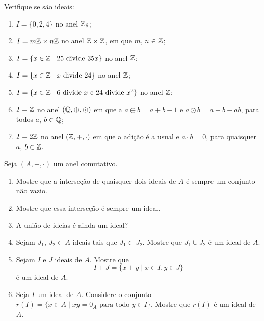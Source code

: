 \documentclass[12pt]{exam}
\begin{document}
    \questao{} Verifique se são ideais:
    \begin{enumerate}[label=({\alph*})]
        \item  $I = \{\overline{0}, \overline{2}, \overline{4}\}$ no anel $\mathbb{Z}_6$;

        \item $I = m\mathbb{Z} \times n\mathbb{Z}$ no anel $\mathbb{Z} \times \mathbb{Z}$, em que $m$, $n \in \mathbb{Z}$;

        \item $I = \{x \in \mathbb{Z} \mid 25 \mbox{ divide } 35x\}$ no anel $\mathbb{Z}$;

        \item $I = \{x \in \mathbb{Z} \mid x \mbox{ divide } 24\}$ no anel $\mathbb{Z}$;

        \item $I = \{x \in \mathbb{Z} \mid 6 \mbox{ divide } x \mbox{ e } 24 \mbox{ divide } x^2\}$ no anel $\mathbb{Z}$;

        \item $I = \mathbb{Z}$ no anel $(\mathbb{Q}, \oplus, \odot)$ em que a $a \oplus b = a + b - 1$ e $a \odot b = a + b - ab$, para todos $a$, $b \in \mathbb{Q}$;

        \item $I = 2\mathbb{Z}$ no anel $(\mathbb{Z}, +, \cdot)$ em que a adição é a usual e $a \cdot b = 0$, para quaisquer $a$, $b \in \mathbb{Z}$.
    \end{enumerate}

    \vspace{.3cm}

    \questao{} Seja $(A, +, \cdot)$ um anel comutativo.
    \begin{enumerate}[label=({\alph*})]
        \item Mostre que a interseção de quaisquer dois ideais de $A$ é sempre um conjunto não vazio.

        \item Mostre que essa interseção é sempre um ideal.

        \item A união de ideias é ainda um ideal?

        \item Sejam $J_1$, $J_2 \subset A$ ideais tais que $J_1 \subset J_2$. Mostre que $J_1 \cup J_2$ é um ideal de $A$.

        \item Sejam $I$ e $J$ ideais de $A$. Mostre que
        \[
            I + J = \{x + y \mid x \in I, y \in J\}
        \]
        é um ideal de $A$.

    \item Seja $I$ um ideal de $A$. Considere o conjunto $r(I) = \{x \in A \mid xy = 0_A \mbox{ para todo } y \in I\}$. Mostre que
        $r(I)$ é um ideal de $A$.
    \end{enumerate}
\end{document}
